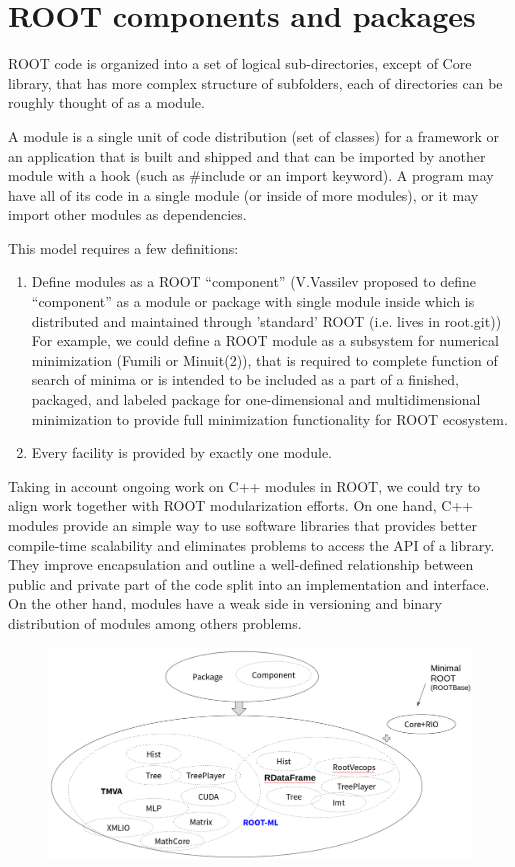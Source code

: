 \documentclass{webofc}
\begin{document}
\section{ROOT components and packages}

ROOT code is organized into a set of logical sub-directories, except of Core library, that has more complex structure of subfolders, each of directories can be roughly thought of as a module. 

A module is a single unit of code distribution (set of classes) for a framework or an application that is built and shipped and that can be imported by another module with a hook (such as #include or an import keyword). A program may have all of its code in a single module (or inside of more modules), or it may import other modules as dependencies.

This model requires a few definitions:
\begin{enumerate}
\item Define modules as a ROOT “component” (V.Vassilev proposed to define “component” as  a module or package with single module inside which is distributed and maintained through 'standard' ROOT (i.e. lives in root.git))
For example, we could define a ROOT module as a subsystem for numerical minimization (Fumili or Minuit(2)), that is required to complete function of search of minima or is intended to be included as a part of a finished, packaged, and labeled package for one-dimensional and multidimensional minimization to provide full minimization functionality for ROOT ecosystem. 
\item Every facility is provided by exactly one module.
\end{enumerate}

Taking in account ongoing work on C++ modules in ROOT, we could try to align work together with ROOT modularization efforts. On one hand, C++ modules provide an simple way to use software libraries that provides better compile-time scalability and eliminates problems to access the API of a library. They improve encapsulation and outline a well-defined relationship between public and private part of the code split into an implementation and interface. On the other hand, modules have a weak side in versioning and binary distribution of modules among others problems.

\begin{figure}
\includegraphics[width=1.0\linewidth]{picture/1.png}
\caption{}
\label{interp}
\end{figure}
\end{document}
